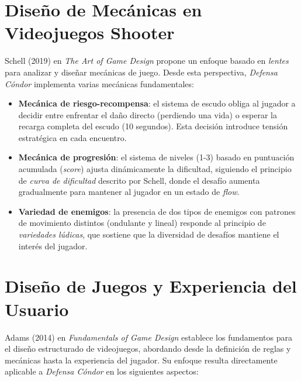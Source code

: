 \documentclass[12pt, a4paper, oneside]{report}
\begin{document}
\section{Diseño de Mecánicas en Videojuegos Shooter}

Schell (2019) en \textit{The Art of Game Design} propone un enfoque basado en \textit{lentes} para analizar y diseñar mecánicas de juego. Desde esta perspectiva, \textit{Defensa Cóndor} implementa varias mecánicas fundamentales:

\begin{itemize}
    \item \textbf{Mecánica de riesgo-recompensa}: el sistema de escudo obliga al jugador a decidir entre enfrentar el daño directo (perdiendo una vida) o esperar la recarga completa del escudo (10 segundos). Esta decisión introduce tensión estratégica en cada encuentro.
    \item \textbf{Mecánica de progresión}: el sistema de niveles (1-3) basado en puntuación acumulada (\textit{score}) ajusta dinámicamente la dificultad, siguiendo el principio de \textit{curva de dificultad} descrito por Schell, donde el desafío aumenta gradualmente para mantener al jugador en un estado de \textit{flow}.
    \item \textbf{Variedad de enemigos}: la presencia de dos tipos de enemigos con patrones de movimiento distintos (ondulante y lineal) responde al principio de \textit{variedades lúdicas}, que sostiene que la diversidad de desafíos mantiene el interés del jugador.
\end{itemize}

\section{Diseño de Juegos y Experiencia del Usuario}

Adams (2014) en \textit{Fundamentals of Game Design} establece los fundamentos para el diseño estructurado de videojuegos, abordando desde la definición de reglas y mecánicas hasta la experiencia del jugador. Su enfoque resulta directamente aplicable a \textit{Defensa Cóndor} en los siguientes aspectos:
\end{document}
